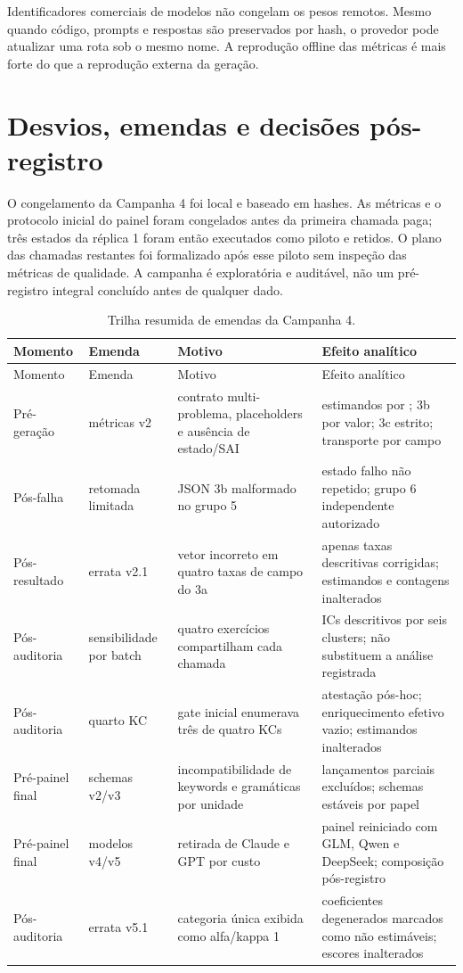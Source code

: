 \documentclass[11pt,a4paper]{article}
\begin{document}
Identificadores comerciais de modelos não congelam os pesos remotos. Mesmo quando código, prompts e respostas são preservados por hash, o provedor pode atualizar uma rota sob o mesmo nome. A reprodução offline das métricas é mais forte do que a reprodução externa da geração.

\section{Desvios, emendas e decisões pós-registro}

O congelamento da Campanha 4 foi local e baseado em hashes. As métricas e o protocolo inicial do painel foram congelados antes da primeira chamada paga; três estados da réplica 1 foram então executados como piloto e retidos. O plano das chamadas restantes foi formalizado após esse piloto sem inspeção das métricas de qualidade. A campanha é exploratória e auditável, não um pré-registro integral concluído antes de qualquer dado.

\begingroup
\footnotesize
\setlength{\tabcolsep}{3pt}
\begin{longtable}{@{}P{1.9cm}P{2.8cm}P{5.3cm}P{3.8cm}@{}}
\caption{Trilha resumida de emendas da Campanha 4.}\label{tab:s-amendments}\\
\toprule
Momento & Emenda & Motivo & Efeito analítico \\
\midrule
\endfirsthead
\toprule
Momento & Emenda & Motivo & Efeito analítico \\
\midrule
\endhead
Pré-geração & métricas v2 & contrato multi-problema, placeholders e ausência de estado/SAI & estimandos por ; 3b por valor; 3c estrito; transporte por campo \\
Pós-falha & retomada limitada & JSON 3b malformado no grupo 5 & estado falho não repetido; grupo 6 independente autorizado \\
Pós-resultado & errata v2.1 & vetor incorreto em quatro taxas de campo do 3a & apenas taxas descritivas corrigidas; estimandos e contagens inalterados \\
Pós-auditoria & sensibilidade por batch & quatro exercícios compartilham cada chamada & ICs descritivos por seis clusters; não substituem a análise registrada \\
Pós-auditoria & quarto KC & gate inicial enumerava três de quatro KCs & atestação pós-hoc; enriquecimento efetivo vazio; estimandos inalterados \\
Pré-painel final & schemas v2/v3 & incompatibilidade de keywords e gramáticas por unidade & lançamentos parciais excluídos; schemas estáveis por papel \\
Pré-painel final & modelos v4/v5 & retirada de Claude e GPT por custo & painel reiniciado com GLM, Qwen e DeepSeek; composição pós-registro \\
Pós-auditoria & errata v5.1 & categoria única exibida como alfa/kappa 1 & coeficientes degenerados marcados como não estimáveis; escores inalterados \\
\bottomrule
\end{longtable}
\endgroup
\end{document}
